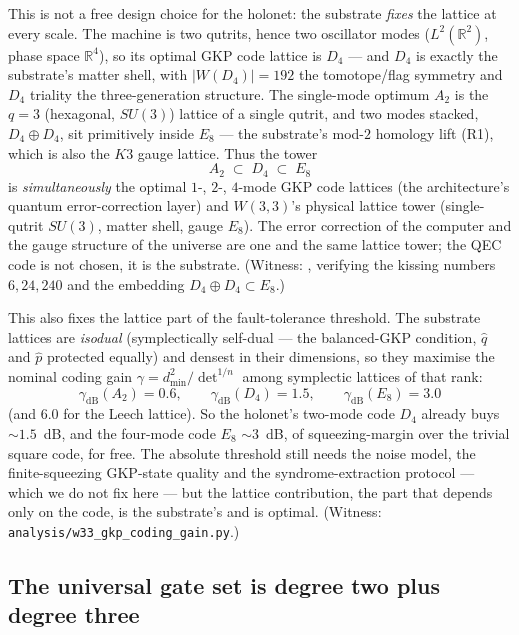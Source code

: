 \documentclass[11pt]{article}
\begin{document}
This is not a free design choice for the holonet: the substrate \emph{fixes}
the lattice at every scale. The machine is two qutrits, hence two oscillator
modes ($L^2(\mathbb R^2)$, phase space $\mathbb R^4$), so its optimal GKP code
lattice is $D_4$ --- and $D_4$ is exactly the substrate's matter shell, with
$|W(D_4)|=192$ the tomotope/flag symmetry and $D_4$ triality the
three-generation structure. The single-mode optimum $A_2$ is the $q=3$
(hexagonal, $SU(3)$) lattice of a single qutrit, and two modes stacked,
$D_4\oplus D_4$, sit primitively inside $E_8$ --- the substrate's mod-$2$
homology lift (R1), which is also the $K3$ gauge lattice. Thus the tower
\[
  A_2 \;\subset\; D_4 \;\subset\; E_8
\]
is \emph{simultaneously} the optimal $1$-, $2$-, $4$-mode GKP code lattices
(the architecture's quantum error-correction layer) and $W(3,3)$'s physical
lattice tower (single-qutrit $SU(3)$, matter shell, gauge $E_8$). The error
correction of the computer and the gauge structure of the universe are one and
the same lattice tower; the QEC code is not chosen, it is the substrate.
(Witness: , verifying the
kissing numbers $6,24,240$ and the embedding $D_4\oplus D_4\subset E_8$.)

This also fixes the lattice part of the fault-tolerance threshold. The substrate
lattices are \emph{isodual} (symplectically self-dual --- the balanced-GKP
condition, $\hat q$ and $\hat p$ protected equally) and densest in their
dimensions, so they maximise the nominal coding gain
$\gamma=d_{\min}^2/\det^{1/n}$ among symplectic lattices of that rank:
\[
  \gamma_{\mathrm{dB}}(A_2)=0.6,\qquad \gamma_{\mathrm{dB}}(D_4)=1.5,\qquad
  \gamma_{\mathrm{dB}}(E_8)=3.0
\]
(and $6.0$ for the Leech lattice). So the holonet's two-mode code $D_4$ already
buys $\sim 1.5$~dB, and the four-mode code $E_8$ $\sim 3$~dB, of squeezing-margin
over the trivial square code, for free. The absolute threshold still needs the
noise model, the finite-squeezing GKP-state quality and the syndrome-extraction
protocol --- which we do not fix here --- but the lattice contribution, the part
that depends only on the code, is the substrate's and is optimal. (Witness:
\texttt{analysis/w33\_gkp\_coding\_gain.py}.)

\subsection{The universal gate set is degree two plus degree three}
\end{document}

